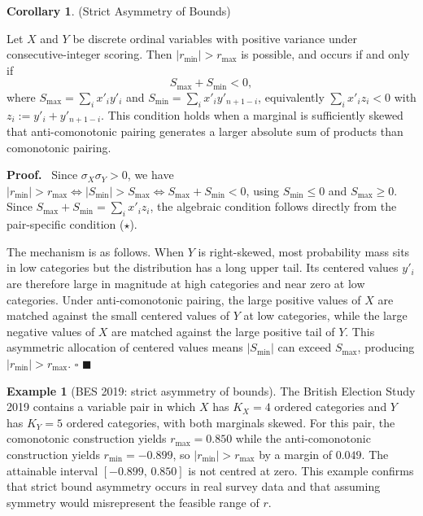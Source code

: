 \documentclass[
  12pt,
]{article}
\theoremstyle{plain}
\theoremstyle{definition}
\newtheorem{corollary}{Corollary}
\newtheorem{example}{Example}
\renewenvironment{proof}
   {\par\noindent\textbf{Proof.}\ }
   {\hfill$\blacksquare$\par}
\theoremstyle{remark}
\begin{document}
\label{corr-asymmetry}
\begin{corollary}{(Strict Asymmetry of Bounds)}

Let $X$ and $Y$ be discrete ordinal variables with positive variance under consecutive-integer scoring.
Then $|r_{\min}| > r_{\max}$ is possible, and occurs if and only if
$$
S_{\max} + S_{\min} < 0,
$$
where $S_{\max} = \sum_i x'_i y'_i$ and $S_{\min} = \sum_i x'_i y'_{n+1-i}$, equivalently $\sum_i x'_i z_i < 0$ with $z_i := y'_i + y'_{n+1-i}$.
This condition holds when a marginal is sufficiently skewed that anti-comonotonic pairing generates a larger absolute sum of products than comonotonic pairing.
\end{corollary}

\begin{proof}
Since \(\sigma_X \sigma_Y > 0\), we have
\(|r_{\min}| > r_{\max} \iff |S_{\min}| > S_{\max} \iff S_{\max} + S_{\min} < 0\),
using \(S_{\min} \leq 0\) and \(S_{\max} \geq 0\). Since
\(S_{\max} + S_{\min} = \sum_i x'_i z_i\), the algebraic condition
follows directly from the pair-specific condition (\(\star\)).

The mechanism is as follows. When \(Y\) is right-skewed, most
probability mass sits in low categories but the distribution has a long
upper tail. Its centered values \(y'_i\) are therefore large in
magnitude at high categories and near zero at low categories. Under
anti-comonotonic pairing, the large positive values of \(X\) are matched
against the small centered values of \(Y\) at low categories, while the
large negative values of \(X\) are matched against the large positive
tail of \(Y\). This asymmetric allocation of centered values means
\(|S_{\min}|\) can exceed \(S_{\max}\), producing
\(|r_{\min}| > r_{\max}\). \(\square\)
\end{proof}

\begin{example}[BES 2019: strict asymmetry of bounds]
The British Election Study 2019 contains a variable pair in which $X$ has $K_X = 4$ ordered categories and $Y$ has $K_Y = 5$ ordered categories, with both marginals skewed.
For this pair, the comonotonic construction yields $r_{\max} = 0.850$ while the anti-comonotonic construction yields $r_{\min} = -0.899$, so $|r_{\min}| > r_{\max}$ by a margin of $0.049$.
The attainable interval $[-0.899,\, 0.850]$ is not centred at zero.
This example confirms that strict bound asymmetry occurs in real survey data and that assuming symmetry would misrepresent the feasible range of $r$.
\end{example}
\end{document}
